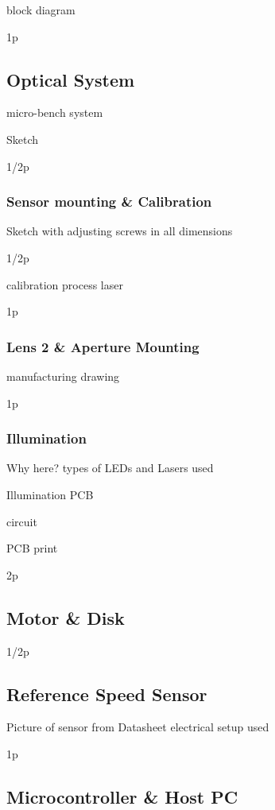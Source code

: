 \documentclass[12pt,a4paper]{article}
\begin{document}
block diagram

1p

\subsection{Optical System}

micro-bench system

Sketch

1/2p

\subsubsection{Sensor mounting \& Calibration}

Sketch with adjusting screws in all dimensions

1/2p

calibration process
  laser

1p

\subsubsection{Lens 2 \& Aperture Mounting}

manufacturing drawing

1p

\subsubsection{Illumination}

  Why here?
  types of LEDs and Lasers used
 
  Illumination PCB

  circuit

  PCB print

2p

\subsection{Motor \& Disk}

1/2p

\subsection{Reference Speed Sensor}
      Picture of sensor from Datasheet
      electrical setup used

1p

\subsection{Microcontroller \& Host PC}      
\end{document}
